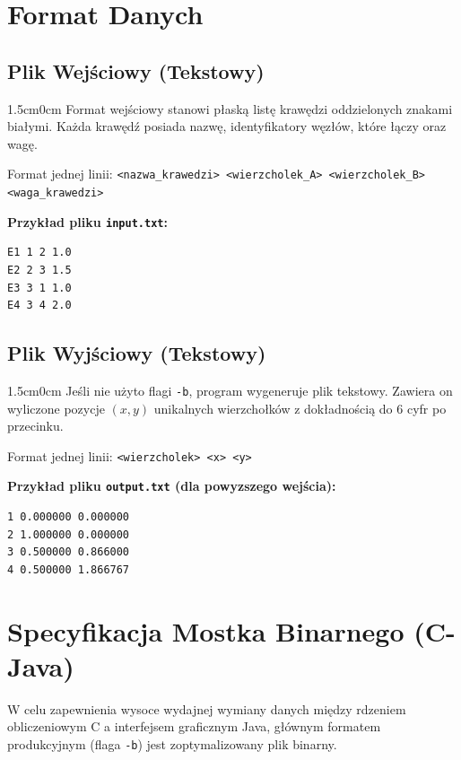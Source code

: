 \documentclass[12pt,a4paper]{article}
\begin{document}
\section{Format Danych}

\noindent
\begin{minipage}{\textwidth}
\subsection{Plik Wejściowy (Tekstowy)}
\begin{adjustwidth}{1.5cm}{0cm}
Format wejściowy stanowi płaską listę krawędzi oddzielonych znakami białymi. Każda krawędź posiada nazwę, identyfikatory węzłów, które łączy oraz wagę.

Format jednej linii: \texttt{<nazwa\_krawedzi> <wierzcholek\_A> <wierzcholek\_B> <waga\_krawedzi>}

\textbf{Przykład pliku \texttt{input.txt}:}
\begin{lstlisting}[style=terminal]
E1 1 2 1.0
E2 2 3 1.5
E3 3 1 1.0
E4 3 4 2.0
\end{lstlisting}
\end{adjustwidth}
\end{minipage}
\vspace{0.5cm}

\noindent
\begin{minipage}{\textwidth}
\subsection{Plik Wyjściowy (Tekstowy)}
\begin{adjustwidth}{1.5cm}{0cm}
Jeśli nie użyto flagi \texttt{-b}, program wygeneruje plik tekstowy. Zawiera on wyliczone pozycje $(x,y)$ unikalnych wierzchołków z dokładnością do 6 cyfr po przecinku.

Format jednej linii: \texttt{<wierzcholek> <x> <y>}

\textbf{Przykład pliku \texttt{output.txt} (dla powyzszego wejścia):}
\begin{lstlisting}[style=terminal]
1 0.000000 0.000000
2 1.000000 0.000000
3 0.500000 0.866000
4 0.500000 1.866767
\end{lstlisting}
\end{adjustwidth}
\end{minipage}
\vspace{0.5cm}

\section{Specyfikacja Mostka Binarnego (C-Java)}
W celu zapewnienia wysoce wydajnej wymiany danych między rdzeniem obliczeniowym C a interfejsem graficznym Java, głównym formatem produkcyjnym (flaga \texttt{-b}) jest zoptymalizowany plik binarny. 
\end{document}
